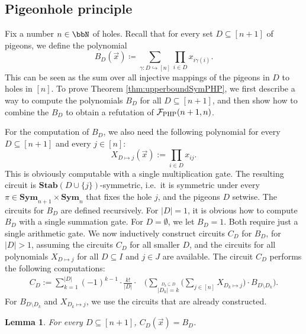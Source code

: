 \documentclass[10pt,a4paper]{article}
\newtheorem{lemma}[theorem]{Lemma}
\newcommand{\Sym}{{\mathbf{Sym}}}
\newcommand{\Ff}{{\cal F}}
\newcommand{\Stab}{\mathbf{Stab}}
\newcommand{\PHP}{\Ff_{\mathrm{PHP}}}
\begin{document}
\subsection{Pigeonhole principle}

\PHPupperBound*

Fix a number $n \in \bbN$ of holes.
Recall that for every set $D \subseteq [n+1]$ of pigeons, we define the polynomial
\[
B_D(\vec x) \coloneqq \sum_{\gamma \colon D \hookrightarrow [n]} \prod_{i \in D} x_{i\gamma(i)}.
\]
This can be seen as the sum over all injective mappings of the pigeons in $D$ to holes in $[n]$.
To prove Theorem \ref{thm:upperboundSymPHP}, we first describe a way to compute the polynomials $B_D$ for all $D \subseteq [n+1]$, and then show how to combine the $B_D$ to obtain a refutation of $\PHP(n+1,n)$.

For the computation of $B_D$, we also need the following polynomial for every $D \subseteq [n+1]$ and every $j \in [n]$: 
\[
X_{D \mapsto j}(\vec x) := \prod_{i \in D} x_{ij}.        
\]
This is obviously computable with a single multiplication gate. The resulting circuit is $\Stab(D \cup \{j\})$-symmetric, i.e.\ it is symmetric under every $\pi \in \Sym_{n+1} \times \Sym_n$ that fixes the hole $j$, and the pigeons $D$ setwise. 
The circuits for $B_D$ are defined recursively.
For $|D| = 1$, it is obvious how to compute $B_D$ with a single summation gate. For $D = \emptyset$, we let $B_D = 1$.
Both require just a single arithmetic gate. 
We now inductively construct circuits $C_D$ for $B_D$, for $|D| > 1$, assuming the circuits $C_D$ for all smaller $D$, and the circuits for all polynomials $X_{D \mapsto j}$ for all $D \subseteq I$ and $j \in J$ are available. The circuit $C_D$ performs the following computations:
\begin{align*}
	C_D := \sum_{k=1}^{|D|} (-1)^{k-1} \cdot \frac{k!}{|D|} \cdot &\Big(\sum_{\stackrel{D_k \subseteq D}{|D_k| = k}} \Big(\sum_{j \in [n]} X_{D_k \mapsto j}\Big) \cdot B_{D \setminus D_k} \Big).
\end{align*}	
For $B_{D \setminus D_k}$ and $X_{D_k \mapsto j}$, we use the circuits that are already constructed.
\begin{lemma}
	\label{lem:bijectionCircuitCorrect}
	For every $D \subseteq [n+1]$, $C_D(\vec x) = B_D$.
\end{lemma}	
\end{document}
